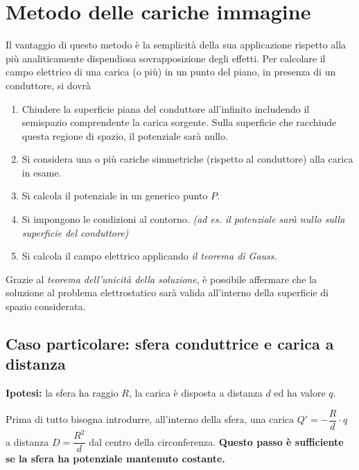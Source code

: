 \documentclass{article}
\begin{document}
\newpage

\section{Metodo delle cariche immagine}
Il vantaggio di questo metodo è la semplicità della sua applicazione rispetto alla più analiticamente dispendiosa sovrapposizione degli effetti.
Per calcolare il campo elettrico di una carica (o più) in un punto del piano, in presenza di un conduttore, si dovrà
\begin{enumerate}
	\item Chiudere la superficie piana del conduttore all'infinito includendo il semispazio comprendente la carica sorgente. Sulla superficie che racchiude questa regione di spazio, il potenziale sarà nullo.
	\item Si considera una o più cariche simmetriche (rispetto al conduttore) alla carica in esame.
	\item Si calcola il potenziale in un generico punto \(P\).
	\item Si impongono le condizioni al contorno. \textit{(ad es. il potenziale sarà nullo sulla superficie del conduttore)}
	\item Si calcola il campo elettrico applicando \textit{il teorema di Gauss.}
\end{enumerate}
Grazie al \textit{teorema dell'unicità della soluzione}, è possibile affermare che la soluzione al problema elettrostatico sarà valida all'interno della superficie di spazio considerata.

\subsection{Caso particolare: sfera conduttrice e carica a distanza}
\textbf{Ipotesi:} la sfera ha raggio \(R\), la carica è disposta a distanza \(d\) ed ha valore \(q\).

Prima di tutto bisogna introdurre, all'interno della sfera, una carica \(Q'  = -\dfrac{R}{d} \cdot q\) a distanza \( D = \dfrac{R^2}{d}\) dal centro della circonferenza. \textbf{Questo passo è sufficiente se la sfera ha potenziale mantenuto costante.} 
\end{document}
